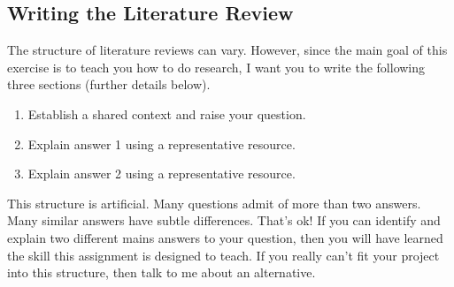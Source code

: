 \documentclass[oneside]{article}
\begin{document}

\subsection*{Writing the Literature Review}\label{writing-the-literature-reviewdo-submit-this-part}

The structure of literature reviews can vary. However, since the main goal of this exercise is to teach you
how to do research, I want you to write the following three sections (further details below).

\begin{enumerate}
\item Establish a shared context and raise your question. 
\item Explain answer 1 using a representative resource. 
\item Explain answer 2 using a representative resource.
\end{enumerate}
 This structure is artificial. Many questions admit of more than two
answers. Many similar answers have subtle differences. That's ok! If you
can identify and explain two different mains answers to your question,
then you will have learned the skill this assignment is designed to
teach. If you really can't fit your project into this structure, then talk to me about an alternative.
\end{document}
